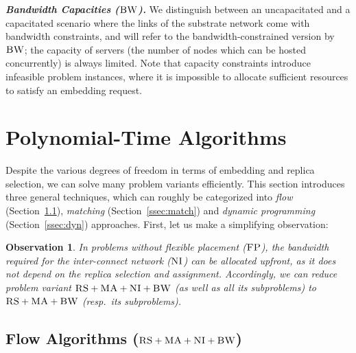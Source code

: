 \documentclass[preprint,12pt]{elsarticle}
\newcommand{\CC}{\textsc{NI}}
\newcommand{\FP}{\textsc{FP}}
\newcommand{\RS}{\textsc{RS}}
\newcommand{\BW}{\textsc{BW}}
\newcommand{\MA}{\textsc{MA}}
\newtheorem{obs}{Observation}
\newcommand{\CostTrans}{\ensuremath{b_1}}
\newcommand{\CostCom}{\ensuremath{b_2}}
\begin{document}


\textbf{\emph{Bandwidth Capacities ($\BW$).}}
We distinguish between an uncapacitated and a capacitated scenario where the links
of the substrate network come with bandwidth
constraints, and will refer to the bandwidth-constrained version by $\BW$; the capacity of servers
(the number of nodes which can be hosted concurrently) is always limited.
Note that capacity constraints introduce infeasible problem instances, where it is impossible to
allocate sufficient resources to satisfy an embedding request.


\section{Polynomial-Time Algorithms}\label{sec:poly}


Despite the various degrees of freedom in terms of embedding and replica selection,
we can solve many problem variants efficiently.
 This section introduces three general techniques,
 which can roughly be categorized into
 \emph{flow} (Section~\ref{ssec:flow}), \emph{matching} (Section~\ref{ssec:match}) and \emph{dynamic programming}
 (Section~\ref{ssec:dyn}) approaches.
First, let us make a simplifying observation:
\begin{obs}\label{obs:nofp}
In problems without flexible placement ($\FP$),
the bandwidth required
for the inter-connect network ($\CC$) can be allocated \emph{upfront}, 
as it
does not depend on the replica
selection and assignment.
Accordingly, we can reduce problem variant $\RS+\MA+\CC +\BW$ (as well as all its subproblems)
to $\RS+\MA+\BW$ (resp.~its subproblems).
\end{obs}

\subsection{Flow Algorithms ($\RS+\MA+\CC+\BW$)}\label{ssec:flow}
\end{document}
